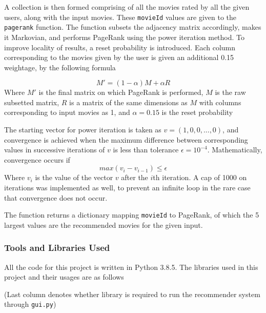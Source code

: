 \documentclass[11pt]{article}
\begin{document}
A collection is then formed comprising of all the movies rated by all
the given users, along with the input movies. These \texttt{movieId}
values are given to the \texttt{pagerank} function. The function subsets
the adjacency matrix accordingly, makes it Markovian, and performs
PageRank using the power iteration method. To improve locality of
results, a reset probability is introduced. Each column corresponding to
the movies given by the user is given an additional 0.15 weightage, by
the following formula

\[ M' = (1-\alpha)M+\alpha R \] Where \(M'\) is the final matrix on
which PageRank is performed, \(M\) is the raw subsetted matrix, \(R\) is
a matrix of the same dimensions as \(M\) with columns corresponding to
input movies as 1, and \(\alpha=0.15\) is the reset probability

The starting vector for power iteration is taken as
\(v=(1, 0, 0, ..., 0)\), and convergence is achieved when the maximum
difference between corresponding values in successive iterations of
\(v\) is less than tolerance \(\epsilon = 10^{-4}\). Mathematically,
convergence occurs if \[ max(v_i-v_{i-1}) \leq \epsilon \] Where \(v_i\)
is the value of the vector \(v\) after the \(i\)th iteration. A cap of
1000 on iterations was implemented as well, to prevent an infinite loop
in the rare case that convergence does not occur.

The function returns a dictionary mapping \texttt{movieId} to PageRank,
of which the 5 largest values are the recommended movies for the given
input.

    \hypertarget{tools-and-libraries-used}{%
\subsubsection{Tools and Libraries
Used}\label{tools-and-libraries-used}}

All the code for this project is written in Python 3.8.5. The libraries
used in this project and their usages are as follows

(Last column denotes whether library is required to run the recommender
system through \texttt{gui.py})
\end{document}
